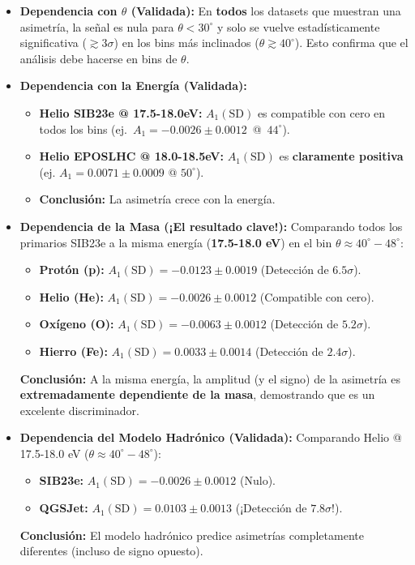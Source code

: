 \begin{itemize}
	\item \textbf{Dependencia con $\theta$ (Validada):} En \textbf{todos} los datasets que muestran una asimetría, la señal es nula para $\theta < 30^\circ$ y solo se vuelve estadísticamente significativa ($\gtrsim 3\sigma$) en los bins más inclinados ($\theta \gtrsim 40^\circ$). Esto confirma que el análisis debe hacerse en bins de $\theta$.
	
	\item \textbf{Dependencia con la Energía (Validada):}
	\begin{itemize}
		\item \textbf{Helio SIB23e @ 17.5-18.0eV:} $A_1(\text{SD})$ es compatible con cero en todos los bins \mbox{(ej. $A_1 = -0.0026 \pm 0.0012$ @ $44^\circ$)}.
		\item \textbf{Helio EPOSLHC @ 18.0-18.5eV:} $A_1(\text{SD})$ es \textbf{claramente positiva} (ej. $A_1 = 0.0071 \pm 0.0009$ @ $50^\circ$).
		\item \textbf{Conclusión:} La asimetría crece con la energía.
	\end{itemize}
	
	\item \textbf{Dependencia de la Masa (¡El resultado clave!):}
	Comparando todos los primarios SIB23e a la misma energía (\textbf{17.5-18.0 eV}) en el bin $\theta \approx 40^\circ-48^\circ$:
	\begin{itemize}
		\item \textbf{Protón (p):} $A_1(\text{SD}) = -0.0123 \pm 0.0019$ (Detección de $6.5\sigma$).
		\item \textbf{Helio (He):} $A_1(\text{SD}) = -0.0026 \pm 0.0012$ (Compatible con cero).
		\item \textbf{Oxígeno (O):} $A_1(\text{SD}) = -0.0063 \pm 0.0012$ (Detección de $5.2\sigma$).
		\item \textbf{Hierro (Fe):} $A_1(\text{SD}) = 0.0033 \pm 0.0014$ (Detección de $2.4\sigma$).
	\end{itemize}
	\textbf{Conclusión:} A la misma energía, la amplitud (y el signo) de la asimetría es \textbf{extremadamente dependiente de la masa}, demostrando que es un excelente discriminador.
	
	\item \textbf{Dependencia del Modelo Hadrónico (Validada):}
	Comparando Helio @ 17.5-18.0 eV ($\theta \approx 40^\circ-48^\circ$):
	\begin{itemize}
		\item \textbf{SIB23e:} $A_1(\text{SD}) = -0.0026 \pm 0.0012$ (Nulo).
		\item \textbf{QGSJet:} $A_1(\text{SD}) = 0.0103 \pm 0.0013$ (¡Detección de $7.8\sigma$!).
	\end{itemize}
	\textbf{Conclusión:} El modelo hadrónico predice asimetrías completamente diferentes (incluso de signo opuesto).
\end{itemize}

